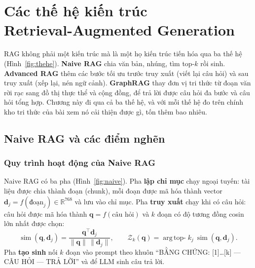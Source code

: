 \chapter[Các thế hệ kiến trúc Retrieval-Augmented Generation]{Các thế hệ kiến trúc\\
Retrieval-Augmented Generation}\label{chap:rag}

RAG không phải một kiến trúc mà là một họ kiến trúc tiến hóa qua ba thế hệ~\cite{gao2023survey}
(Hình~\ref{fig:thehe}). \textbf{Naive RAG} chia văn bản, nhúng, tìm top-$k$ rồi sinh. \textbf{Advanced RAG} thêm
các bước tối ưu trước truy xuất (viết lại câu hỏi) và sau truy xuất (xếp lại, nén ngữ cảnh). \textbf{GraphRAG}
thay đơn vị tri thức từ đoạn văn rời rạc sang đồ thị thực thể và cộng đồng, để trả lời được câu hỏi đa bước và
câu hỏi tổng hợp. Chương này đi qua cả ba thế hệ, và với mỗi thế hệ đo trên chính kho tri thức của bài xem nó cải
thiện được gì, tốn thêm bao nhiêu.


\section{Naive RAG và các điểm nghẽn}
\subsection{Quy trình hoạt động của Naive RAG}
Naive RAG có ba pha (Hình~\ref{fig:naive}). Pha \textbf{lập chỉ mục} chạy ngoại tuyến: tài liệu được chia thành
đoạn (chunk), mỗi đoạn được mã hóa thành vector $\mathbf{d}_j = f(\text{đoạn}_j) \in \mathbb{R}^{768}$ và lưu vào
chỉ mục. Pha \textbf{truy xuất} chạy khi có câu hỏi: câu hỏi được mã hóa thành $\mathbf{q} = f(\text{câu hỏi})$ và
$k$ đoạn có độ tương đồng cosin lớn nhất được chọn:
\begin{equation}
  \operatorname{sim}(\mathbf{q}, \mathbf{d}_j) = \frac{\mathbf{q}^\top \mathbf{d}_j}{\lVert\mathbf{q}\rVert\,\lVert\mathbf{d}_j\rVert},
  \qquad \mathcal{Z}_k(\mathbf{q}) = \operatorname*{arg\,top-}k_{j}\ \operatorname{sim}(\mathbf{q}, \mathbf{d}_j).
\end{equation}
Pha \textbf{tạo sinh} nối $k$ đoạn vào prompt theo khuôn ``BẰNG CHỨNG: [1]\dots[k] — CÂU HỎI — TRẢ LỜI'' và để LLM
sinh câu trả lời.

